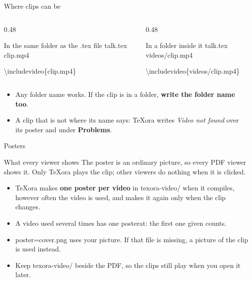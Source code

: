 \documentclass[aspectratio=169]{beamer}
\newcommand{\code}[1]{{\small\ttfamily #1}}
\begin{document}
\begin{frame}{Where clips can be}
  \begin{columns}[T]
    \begin{column}{0.48\textwidth}
      \begin{block}{In the same folder as the .tex file}
        \code{talk.tex}\\
        \code{clip.mp4}\par\smallskip
        \code{\textbackslash includevideo\{clip.mp4\}}
      \end{block}
    \end{column}
    \begin{column}{0.48\textwidth}
      \begin{block}{In a folder inside it}
        \code{talk.tex}\\
        \code{videos/clip.mp4}\par\smallskip
        \code{\textbackslash includevideo\{videos/clip.mp4\}}
      \end{block}
    \end{column}
  \end{columns}
  \par\medskip
  \begin{itemize}
    \item Any folder name works. If the clip is in a folder, \textbf{write the folder name too}.
    \item A clip that is not where its name says: TeXora writes \emph{Video not found} over its
      poster and under \textbf{Problems}.
  \end{itemize}
\end{frame}

\begin{frame}{Posters}
  \begin{block}{What every viewer shows}
    The poster is an ordinary picture, so every PDF viewer shows it. Only TeXora plays the clip;
    other viewers do nothing when it is clicked.
  \end{block}
  \begin{itemize}
    \item TeXora makes \textbf{one poster per video} in \code{texora-video/} when it compiles, however
      often the video is used, and makes it again only when the clip changes.
    \item A video used several times has one \code{posterat}: the first one given counts.
    \item \code{poster=cover.png} uses your picture. If that file is missing, a picture of the clip
      is used instead.
    \item Keep \code{texora-video/} beside the PDF, so the clips still play when you open it later.
  \end{itemize}
\end{frame}
\end{document}

